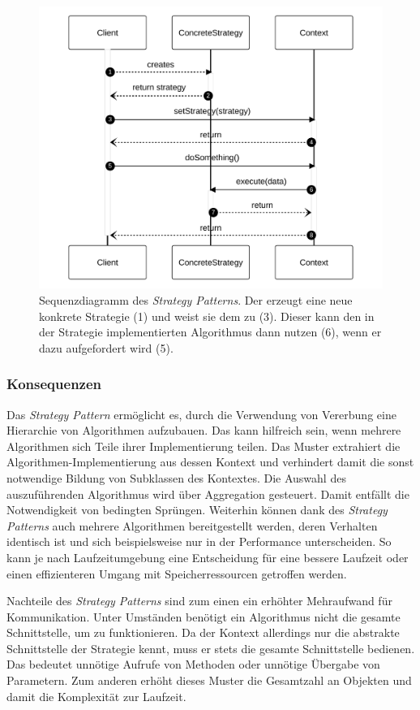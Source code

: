 \begin{figure}[!ht]
	\centering
	\includegraphics[width=0.75\linewidth]{images/patterns/strategy-seq.pdf}
	\caption{Sequenzdiagramm des \emph{Strategy Patterns}. Der  erzeugt eine neue konkrete Strategie (1) und weist sie dem  zu (3). Dieser kann den in der Strategie implementierten Algorithmus dann nutzen (6), wenn er dazu aufgefordert wird (5). \cite{skobeleva_strategy_2023}}
	\label{fig:strategy-seq}
\end{figure}

\subsubsection*{Konsequenzen}
Das \emph{Strategy Pattern} ermöglicht es, durch die Verwendung von Vererbung eine Hierarchie von Algorithmen aufzubauen. Das kann hilfreich sein, wenn mehrere Algorithmen sich Teile ihrer Implementierung teilen. Das Muster extrahiert die Algorithmen-Implementierung aus dessen Kontext und verhindert damit die sonst notwendige Bildung von Subklassen des Kontextes. Die Auswahl des auszuführenden Algorithmus wird über Aggregation gesteuert. Damit entfällt die Notwendigkeit von bedingten Sprüngen. Weiterhin können dank des \emph{Strategy Patterns} auch mehrere Algorithmen bereitgestellt werden, deren Verhalten identisch ist und sich beispielsweise nur in der Performance unterscheiden. So kann je nach Laufzeitumgebung eine Entscheidung für eine bessere Laufzeit oder einen effizienteren Umgang mit Speicherressourcen getroffen werden.

Nachteile des \emph{Strategy Patterns} sind zum einen ein erhöhter Mehraufwand für Kommunikation. Unter Umständen benötigt ein Algorithmus nicht die gesamte Schnittstelle, um zu funktionieren. Da der Kontext allerdings nur die abstrakte Schnittstelle der Strategie kennt, muss er stets die gesamte Schnittstelle bedienen. Das bedeutet unnötige Aufrufe von Methoden oder unnötige Übergabe von Parametern. Zum anderen erhöht dieses Muster die Gesamtzahl an Objekten und damit die Komplexität zur Laufzeit. \cite{gamma_design_1995}